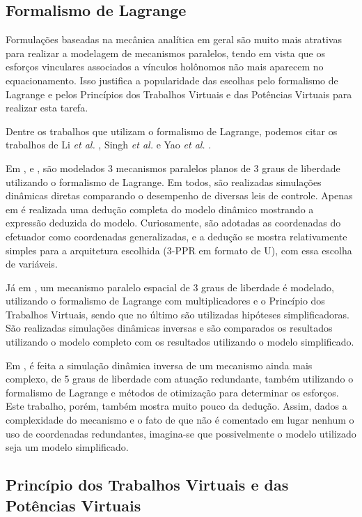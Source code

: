 \documentclass[]{politex}
\begin{document}
\subsection{Formalismo de Lagrange}

Formulações baseadas na mecânica analítica em geral são muito mais atrativas para realizar a modelagem de mecanismos paralelos, tendo em vista que os esforços vinculares associados a vínculos holônomos não mais aparecem no equacionamento. Isso justifica a popularidade das escolhas pelo formalismo de Lagrange e pelos Princípios dos Trabalhos Virtuais e das Potências Virtuais para realizar esta tarefa.

Dentre os trabalhos que utilizam o formalismo de Lagrange, podemos citar os trabalhos de  Li \emph{et al.} \cite{Li3}, Singh \emph{et al.} \cite{Singh, Singh2, Singh3} e Yao \emph{et al.} \cite{Yao}.

Em \cite{Singh}, \cite{Singh2} e \cite{Singh3}, são modelados 3 mecanismos paralelos planos de 3 graus de liberdade utilizando o formalismo de Lagrange. Em todos, são realizadas simulações dinâmicas diretas comparando o desempenho de diversas leis de controle. Apenas em \cite{Singh2} é realizada uma dedução completa do modelo dinâmico mostrando a expressão deduzida do modelo. Curiosamente, são adotadas as coordenadas do efetuador como coordenadas generalizadas, e a dedução se mostra relativamente simples para a arquitetura escolhida (3-PPR em formato de U), com essa escolha de variáveis.

Já em \cite{Li3}, um mecanismo paralelo espacial de 3 graus de liberdade é modelado, utilizando o formalismo de Lagrange com multiplicadores e o Princípio dos Trabalhos Virtuais, sendo que no último são utilizadas hipóteses simplificadoras. São realizadas simulações dinâmicas inversas e são comparados os resultados utilizando o modelo completo com os resultados utilizando o modelo simplificado.

Em \cite{Yao}, é feita a simulação dinâmica inversa de um mecanismo ainda mais complexo, de 5 graus de liberdade com atuação redundante, também utilizando o formalismo de Lagrange e métodos de otimização para determinar os esforços. Este trabalho, porém, também mostra muito pouco da dedução. Assim, dados a complexidade do mecanismo e o fato de que não é comentado em lugar nenhum o uso de coordenadas redundantes, imagina-se que possivelmente o modelo utilizado seja um modelo simplificado.

\subsection{Princípio dos Trabalhos Virtuais e das Potências Virtuais}
\end{document}

